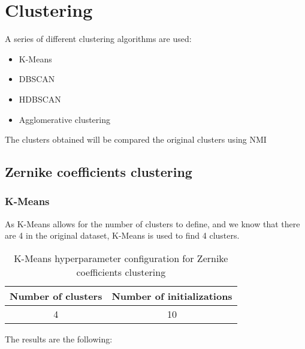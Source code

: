 \section{Clustering}
	
		
		A series of different clustering algorithms are used:
		\begin{itemize}
			\item K-Means
			\item DBSCAN
			\item HDBSCAN
			\item Agglomerative clustering
		\end{itemize}
		
		The clusters obtained will be compared the original clusters using NMI
		
	\subsection{Zernike coefficients clustering}
		
		\subsubsection{K-Means}
			
			As K-Means allows for the number of clusters to define, and we know that there are 4 in the original dataset, K-Means is used to find 4 clusters.
			
			\begin{table}[h!]
				\centering
				\begin{tabular}{|c|c|}
					\hline
					\textbf{Number of clusters} & \textbf{Number of initializations}\\
					\hline
					4 & 10\\
					\hline
				\end{tabular}
				\caption{K-Means hyperparameter configuration for Zernike coefficients clustering}
			\end{table}
		
			The results are the following:
			
